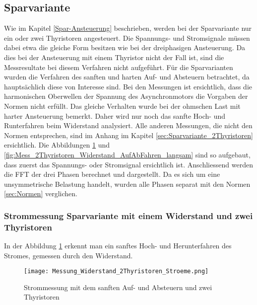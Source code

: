 \newpage
\subsection{Sparvariante}
Wie im Kapitel \ref{Spar-Ansteuerung} beschrieben, werden bei der Sparvariante nur ein oder zwei Thyristoren angesteuert. Die Spannungs- und Stromsignale müssen dabei etwa die gleiche Form besitzen wie bei der dreiphasigen Ansteuerung. Da dies bei der Ansteuerung mit einem Thyristor nicht der Fall ist, sind die Messresultate bei diesem Verfahren nicht aufgeführt. Für die Sparvarianten wurden die Verfahren des sanften und harten Auf- und Absteuern betrachtet, da hauptsächlich diese von Interesse sind. Bei den Messungen ist ersichtlich, dass die harmonischen Oberwellen der Spannung des Asynchronmotors die Vorgaben der Normen nicht erfüllt. Das gleiche Verhalten wurde bei der ohmschen Last mit harter Ansteuerung bemerkt. Daher wird nur noch das sanfte Hoch- und Runterfahren beim Widerstand analysiert. Alle anderen Messungen, die nicht den Normen entsprechen, sind im Anhang im Kapitel \ref{sec:Sparvariante_2Thyristoren} ersichtlich. Die Abbildungen \ref{fig:Mess_2Thyristoren_Widerstand_AufAbFahren_langsam_stroeme} und \ref{fig:Mess_2Thyristoren_Widerstand_AufAbFahren_langsam} sind so aufgebaut, dass zuerst das Spannungs- oder Stromsignal ersichtlich ist. Anschliessend werden die FFT der drei Phasen berechnet und dargestellt. Da es sich um eine unsymmetrische Belastung handelt, wurden alle Phasen separat mit den Normen \ref{sec:Normen} verglichen.

\subsubsection{Strommessung Sparvariante mit einem Widerstand und zwei Thyristoren}

In der Abbildung \ref{fig:Mess_2Thyristoren_Widerstand_AufAbFahren_langsam_stroeme} erkennt man ein sanftes Hoch- und Herunterfahren des Stromes, gemessen durch den Widerstand.

\begin{figure}[ht]
	\centering
	\texttt{[image: Messung\_Widerstand\_2Thyristoren\_Stroeme.png]}	
	\caption{Strommessung mit dem sanften Auf- und Absteuern und zwei Thyristoren}\label{fig:Mess_2Thyristoren_Widerstand_AufAbFahren_langsam_stroeme}	
\end{figure}

